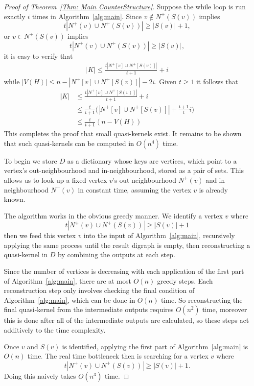\documentclass[12pt]{article}
\theoremstyle{definition}
\begin{document}
\begin{proof}[Proof of Theorem~\ref{Thm: Main CounterStructure}]
Suppose the while loop is run exactly $i$ times in Algorithm~\ref{alg:main}.
Since $v \notin N^+(S(v))$ implies
\[
t|N^+(v) \cup N^+(S(v))| \geq |S(v)|+1,
\]
or  $v \in N^+(S(v))$ implies
\[
t|N^+(v) \cup N^+(S(v))| \geq |S(v)|,
\]
it is easy to verify that
\begin{align*}
    |K| \leq \frac{t|N^+[v] \cup N^+[S(v)]|}{t+1} + i
\end{align*}
while $|V(H)| \leq n - |N^+[v] \cup N^+[S(v)]|-2i$.
Given $t\geq 1$ it follows that
\begin{align*}
    |K| & \leq \frac{t|N^+[v] \cup N^+[S(v)]|}{t+1} + i \\
    & \leq \frac{t}{t+1}\Big(|N^+[v] \cup N^+[S(v)]| + \frac{t+1}{t}i\Big) \\
    & \leq \frac{t}{t+1}(n - V(H))
\end{align*}
This completes the proof that small quasi-kernels exist.
It remains to be shown that such quasi-kernels can be computed in $O(n^4)$ time.


    To begin we store $D$ as a dictionary whose keys are vertices, which point to a vertex's out-neighbourhood and in-neighbourhood, 
    stored as a pair of sets.
    This allows us to look up a fixed vertex $v$'s out-neighbourhood $N^+(v)$ and in-neighbourhood $N^-(v)$ in constant time,
    assuming the vertex $v$ is already known.

    The algorithm works in the obvious greedy manner.
    We identify a vertex $v$ where 
    \[
    t|N^+(v) \cup N^+(S(v))| \geq |S(v)|+1
    \]
    then we feed this vertex $v$ into the input of Algorithm~\ref{alg:main}, 
    recursively applying the same process until the result digraph is empty, then reconstructing
    a quasi-kernel in $D$ by combining the outputs at each step.
    
    Since the number of vertices is decreasing with each application of the first part of 
    Algorithm~\ref{alg:main}, there are at most $O(n)$ greedy steps.
    Each reconstruction step only involves checking the final condition of Algorithm~\ref{alg:main},
    which can be done in $O(n)$ time.
    So reconstructing the final quasi-kernel from the intermediate outputs requires $O(n^2)$ time,
    moreover this is done after all of the intermediate outputs are calculated, so these steps act additively to the time complexity.

    Once $v$ and $S(v)$ is identified, 
    applying the first part of Algorithm~\ref{alg:main} is $O(n)$ time.
    The real time bottleneck then is searching for a vertex $v$ where 
    \[
    t|N^+(v) \cup N^+(S(v))| \geq |S(v)|+1.
    \]
    Doing this naively takes $O(n^3)$ time. 
    

\end{proof}
\end{document}
